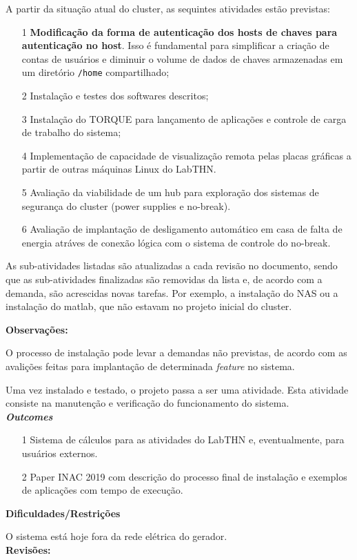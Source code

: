 A partir da situação atual do cluster, as sequintes atividades estão previstas:
\begin{itemize}
	\item[1] \textbf{Modificação da forma de autenticação dos hosts de chaves 
	para autenticação no host}. Isso é fundamental para simplificar a criação 
	de contas de usuários e diminuir o volume de dados de chaves armazenadas em 
	um diretório \texttt{/home} compartilhado;
	\item[2] Instalação e testes dos softwares descritos;
	\item[3] Instalação do TORQUE para lançamento de aplicações e controle de 
	carga de trabalho do sistema;
	\item[4] Implementação de capacidade de visualização remota pelas placas gráficas a partir de outras máquinas Linux do LabTHN.
	\item[5] Avaliação da viabilidade de um hub para exploração dos sistemas de segurança do cluster (power supplies e no-break).
	\item[6] Avaliação de implantação de desligamento automático em casa de falta de energia atráves de conexão lógica com o sistema de controle do no-break.
\end{itemize}

As sub-atividades listadas são atualizadas a cada revisão no documento, sendo que 
as sub-atividades finalizadas são removidas da lista e, de acordo com a demanda, 
são acrescidas novas tarefas. Por exemplo, a instalação do NAS ou a instalação do 
matlab, que não estavam no projeto inicial do cluster.

\textbf{Observações:}

O processo de instalação pode levar a demandas não previstas, de acordo com as avalições feitas para implantação de determinada \textit{feature} no sistema.

Uma vez instalado e testado, o projeto passa a ser uma atividade. Esta atividade 
consiste na manutenção e verificação do funcionamento do sistema.\\

\textbf{\textit{Outcomes}}

\begin{itemize}
	\item[1] Sistema de cálculos para as atividades do LabTHN e, eventualmente, para usuários externos.
	\item[2] Paper INAC 2019 com descrição do processo final de instalação e exemplos de aplicações com tempo de execução.

\end{itemize}


\textbf{Dificuldades/Restrições}

O sistema está hoje fora da rede elétrica do gerador.\\

\textbf{Revisões:}\\
\date{21 de novembro de 2018}\\
\date{30 de novembro de 2018}\\
\date{07 de dezembro de 2018}\\
\date{\today}

